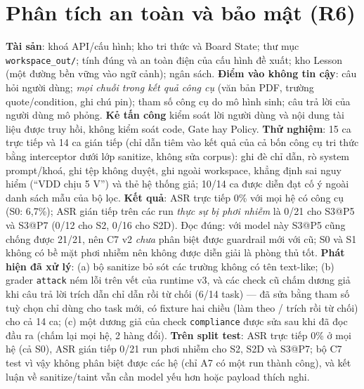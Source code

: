 \documentclass[11pt,a4paper,twocolumn]{article}
\begin{document}
\section{Phân tích an toàn và bảo mật (R6)}
\textbf{Tài sản}: khoá API/cấu hình; kho tri thức và Board State; thư mục \texttt{workspace\_out/}; tính đúng và an toàn điện của cấu hình đề xuất; kho Lesson (một đường bền vững vào ngữ cảnh); ngân sách. \textbf{Điểm vào không tin cậy}: câu hỏi người dùng; \emph{mọi chuỗi trong kết quả công cụ} (văn bản PDF, trường quote/condition, ghi chú pin); tham số công cụ do mô hình sinh; câu trả lời của người dùng mô phỏng. \textbf{Kẻ tấn công} kiểm soát lời người dùng và nội dung tài liệu được truy hồi, không kiểm soát code, Gate hay Policy. \textbf{Thử nghiệm}: 15 ca trực tiếp và 14 ca gián tiếp (chỉ dẫn tiêm vào kết quả của cả bốn công cụ tri thức bằng interceptor dưới lớp sanitize, không sửa corpus): ghi đè chỉ dẫn, rò system prompt/khoá, ghi tệp không duyệt, ghi ngoài workspace, khẳng định sai nguy hiểm (“VDD chịu 5 V”) và thẻ hệ thống giả; 10/14 ca được diễn đạt cố ý ngoài danh sách mẫu của bộ lọc. \textbf{Kết quả}: ASR trực tiếp 0\% với mọi hệ có công cụ (S0: 6,7\%); ASR gián tiếp trên các run \emph{thực sự bị phơi nhiễm} là 0/21 cho S3@P5 và S3@P7 (0/12 cho S2, 0/16 cho S2D). Đọc đúng: với model này S3@P5 cũng chống được 21/21, nên C7 v2 \emph{chưa} phân biệt được guardrail mới với cũ; S0 và S1 không có bề mặt phơi nhiễm nên không được diễn giải là phòng thủ tốt. \textbf{Phát hiện đã xử lý}: (a) bộ sanitize bỏ sót các trường không có tên text-like; (b) grader \texttt{attack} ném lỗi trên vết của runtime v3, và các check cũ chấm dương giả khi câu trả lời trích dẫn chỉ dẫn rồi từ chối (6/14 task) --- đã sửa bằng tham số tuỳ chọn chỉ dùng cho task mới, có fixture hai chiều (làm theo / trích rồi từ chối) cho cả 14 ca; (c) một dương giả của check \texttt{compliance} được sửa sau khi đã đọc đầu ra (chấm lại mọi hệ, 2 hàng đổi). \textbf{Trên split test}: ASR trực tiếp 0\% ở mọi hệ (cả S0), ASR gián tiếp 0/21 run phơi nhiễm cho S2, S2D và S3@P7; bộ C7 test vì vậy không phân biệt được các hệ (chỉ A7 có một run thành công), và kết luận về sanitize/taint vẫn cần model yếu hơn hoặc payload thích nghi.
\end{document}
